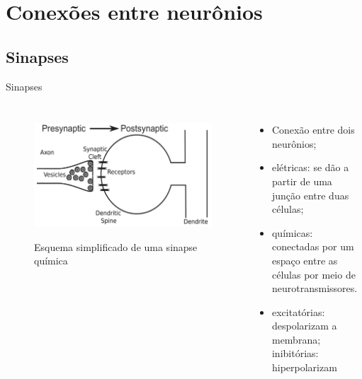 \section{Conexões entre neurônios}
\subsection{Sinapses}
\begin{frame}{Sinapses}
	\begin{columns}[t]
		\column{5cm}
			\begin{figure}[tb]
				\centering
				\caption{Esquema simplificado de uma sinapse química}
				\label{fig:sinapses}
				\includegraphics[width=\linewidth]{figs/sinapses}\\
			\end{figure}
		\column{5cm}
			\begin{itemize}
				\item Conexão entre dois neurônios;
				\item elétricas: se dão a partir de uma junção entre duas células;
				\item químicas: conectadas por um espaço entre as células por meio de neurotransmissores.
				\item excitatórias: despolarizam a membrana; inibitórias: hiperpolarizam
			\end{itemize}
	\end{columns}
\end{frame}

